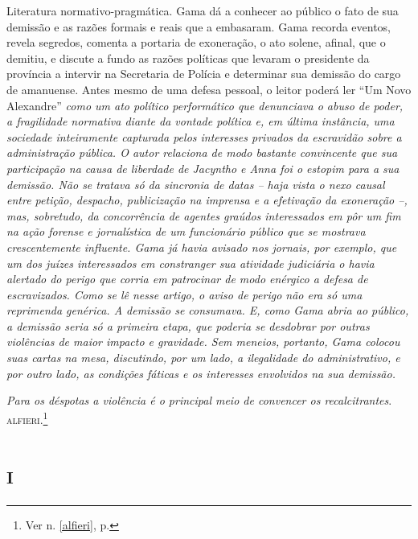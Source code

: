 \begin{didascalia}
Literatura normativo-pragmática. Gama dá a conhecer ao público o fato de
sua demissão e as razões formais e reais que a embasaram. Gama recorda
eventos, revela segredos, comenta a portaria de exoneração, o ato
solene, afinal, que o demitiu, e discute a fundo as razões políticas que
levaram o presidente da província a intervir na Secretaria de Polícia e
determinar sua demissão do cargo de amanuense. Antes mesmo de uma defesa
pessoal, o leitor poderá ler ``Um Novo Alexandre'' \emph{como um ato
político performático que denunciava o abuso de poder, a fragilidade
normativa diante da vontade política e, em última instância, uma
sociedade inteiramente capturada pelos interesses privados da escravidão
sobre a administração pública. O autor relaciona de modo bastante
convincente que sua participação na causa de liberdade de Jacyntho e
Anna foi o estopim para a sua demissão. Não se tratava só da sincronia
de datas -- haja vista o nexo causal entre petição, despacho,
publicização na imprensa e a efetivação da exoneração --, mas,
sobretudo, da concorrência de agentes graúdos interessados em pôr um fim
na ação forense e jornalística de um funcionário público que se mostrava
crescentemente influente. Gama já havia avisado nos jornais, por
exemplo, que um dos juízes interessados em constranger sua atividade
judiciária o havia alertado do perigo que corria em patrocinar de modo
enérgico a defesa de escravizados. Como se lê nesse artigo, o aviso de
perigo não era só uma reprimenda genérica. A demissão se consumava. E,
como Gama abria ao público, a demissão seria só a primeira etapa, que
poderia se desdobrar por outras violências de maior impacto e gravidade.
Sem meneios, portanto, Gama colocou suas cartas na mesa, discutindo, por
um lado, a ilegalidade do administrativo, e por outro lado, as condições
fáticas e os interesses envolvidos na sua demissão.}
\end{didascalia}



\emph{Para os déspotas a violência é o principal meio de convencer os
recalcitrantes}. 
\textsc{alfieri}.\footnote{Ver n. \ref{alfieri}, p. \pageref{alfieri}}

\section{\textsc{i}}

